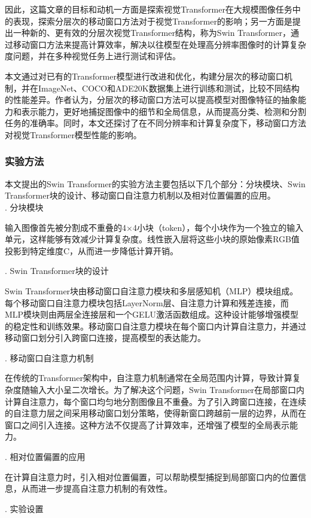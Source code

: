 \documentclass{article}
\begin{document}
因此，这篇文章的目标和动机一方面是探索视觉Transformer在大规模图像任务中的表现，探索分层次的移动窗口方法对于视觉Transformer的影响；另一方面是提出一种新的、更有效的分层次视觉Transformer结构，称为Swin Transformer，通过移动窗口方法来提高计算效率，解决以往模型在处理高分辨率图像时的计算复杂度问题，并在多种视觉任务上进行测试和评估。

本文通过对已有的Transformer模型进行改进和优化，构建分层次的移动窗口机制，并在ImageNet、COCO和ADE20K数据集上进行训练和测试，比较不同结构的性能差异。作者认为，分层次的移动窗口方法可以提高模型对图像特征的抽象能力和表示能力，更好地捕捉图像中的细节和全局信息，从而提高分类、检测和分割任务的准确率。同时，本文还探讨了在不同分辨率和计算复杂度下，移动窗口方法对视觉Transformer模型性能的影响。

\subsubsection{实验方法}
本文提出的Swin Transformer的实验方法主要包括以下几个部分：分块模块、Swin Transformer块的设计、移动窗口自注意力机制以及相对位置偏置的应用。\\
. 分块模块

输入图像首先被分割成不重叠的4×4小块（token），每个小块作为一个独立的输入单元，这样能够有效减少计算复杂度。线性嵌入层将这些小块的原始像素RGB值投影到特定维度C，从而进一步降低计算开销。

. Swin Transformer块的设计

Swin Transformer块由移动窗口自注意力模块和多层感知机（MLP）模块组成。每个移动窗口自注意力模块包括LayerNorm层、自注意力计算和残差连接，而MLP模块则由两层全连接层和一个GELU激活函数组成。这种设计能够增强模型的稳定性和训练效果。移动窗口自注意力模块在每个窗口内计算自注意力，并通过移动窗口划分引入跨窗口连接，提高模型的表达能力。

. 移动窗口自注意力机制

在传统的Transformer架构中，自注意力机制通常在全局范围内计算，导致计算复杂度随输入大小呈二次增长。为了解决这个问题，Swin Transformer在局部窗口内计算自注意力，每个窗口均匀地分割图像且不重叠。为了引入跨窗口连接，在连续的自注意力层之间采用移动窗口划分策略，使得新窗口跨越前一层的边界，从而在窗口之间引入连接。这种方法不仅提高了计算效率，还增强了模型的全局表示能力。

. 相对位置偏置的应用

在计算自注意力时，引入相对位置偏置，可以帮助模型捕捉到局部窗口内的位置信息，从而进一步提高自注意力机制的有效性。

. 实验设置
\end{document}

